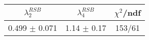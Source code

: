 \begin{tabular}{c|c||c}
$\lambda_{2}^{RSB}$ & $\lambda_4^{RSB}$ & $\chi^{2}$/ndf \\
\hline
0.499 $\pm$ 0.071 & 1.14 $\pm$ 0.17 & 153/61\\
\end{tabular}
